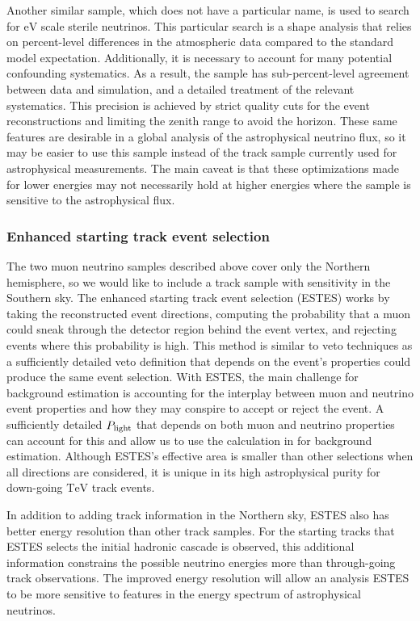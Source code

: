 Another similar sample, which does not have a particular name, is used to search for $\si\eV$ scale sterile neutrinos.
This particular search is a shape analysis that relies on percent-level differences in the atmospheric data compared to the standard model expectation.
Additionally, it is necessary to account for many potential confounding systematics.
As a result, the sample has sub-percent-level agreement between data and simulation, and a detailed treatment of the relevant systematics.
This precision is achieved by strict quality cuts for the event reconstructions and limiting the zenith range to avoid the horizon.
These same features are desirable in a global analysis of the astrophysical neutrino flux, so it may be easier to use this sample instead of the track sample currently used for astrophysical measurements.
The main caveat is that these optimizations made for lower energies may not necessarily hold at higher energies where the sample is sensitive to the astrophysical flux.

\subsubsection{Enhanced starting track event selection}
The two muon neutrino samples described above cover only the Northern hemisphere, so we would like to include a track sample with sensitivity in the Southern sky.
The enhanced starting track event selection (ESTES) works by taking the reconstructed event directions, computing the probability that a muon could sneak through the detector region behind the event vertex, and rejecting events where this probability is high.
This method is similar to veto techniques as a sufficiently detailed veto definition that depends on the event's properties could produce the same event selection.
With ESTES, the main challenge for background estimation is accounting for the interplay between muon and neutrino event properties and how they may conspire to accept or reject the event.
A sufficiently detailed $P_{\rm light}$ that depends on both muon and neutrino properties can account for this and allow us to use the calculation in  for background estimation.
Although ESTES's effective area is smaller than other selections when all directions are considered, it is unique in its high astrophysical purity for down-going $\si\TeV$ track events.

In addition to adding track information in the Northern sky, ESTES also has better energy resolution than other track samples.
For the starting tracks that ESTES selects the initial hadronic cascade is observed, this additional information constrains the possible neutrino energies more than through-going track observations.
The improved energy resolution will allow an analysis ESTES to be more sensitive to features in the energy spectrum of astrophysical neutrinos.


